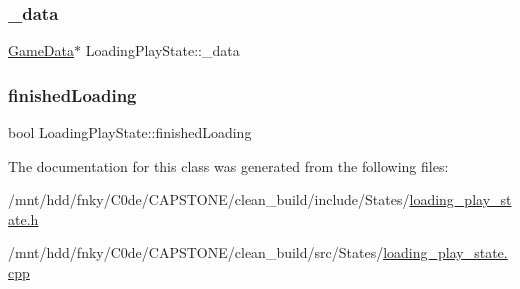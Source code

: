 \subsubsection{\texorpdfstring{\+\_\+data}{\_data}}
{\footnotesize\ttfamily \hyperlink{structGameData}{Game\+Data}$\ast$ Loading\+Play\+State\+::\+\_\+data\hspace{0.3cm}{\ttfamily [private]}}

\mbox{\label{classLoadingPlayState_a1d656d0bcbc21c8f0c69f66b7c748145}} 
\subsubsection{\texorpdfstring{finished\+Loading}{finishedLoading}}
{\footnotesize\ttfamily bool Loading\+Play\+State\+::finished\+Loading\hspace{0.3cm}{\ttfamily [private]}}



The documentation for this class was generated from the following files\+:\begin{DoxyCompactItemize}
\item 
/mnt/hdd/fnky/\+C0de/\+C\+A\+P\+S\+T\+O\+N\+E/clean\+\_\+build/include/\+States/\hyperlink{loading__play__state_8h}{loading\+\_\+play\+\_\+state.\+h}\item 
/mnt/hdd/fnky/\+C0de/\+C\+A\+P\+S\+T\+O\+N\+E/clean\+\_\+build/src/\+States/\hyperlink{loading__play__state_8cpp}{loading\+\_\+play\+\_\+state.\+cpp}\end{DoxyCompactItemize}
